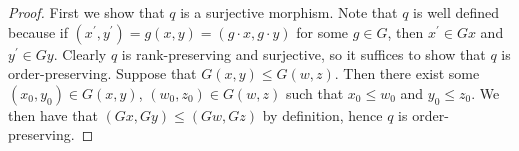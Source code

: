 \documentclass[10 pt]{amsart}
\theoremstyle{plain}
\theoremstyle{definition}
\theoremstyle{remark}
\numberwithin{equation}{section}
\theoremstyle{remark}
\begin{document}
\begin{proof}



First we show that $q$ is a surjective morphism.  Note that $q$ is well defined because if $(x^\prime, y^\prime) = g(x, y) = (g\cdot x, g\cdot y)$ for some $g\in G$, then $x^\prime\in Gx$ and $y^\prime\in Gy$.  Clearly $q$ is rank-preserving and surjective, so it suffices to show that $q$ is order-preserving.  Suppose that $G(x, y) \le G(w, z)$.  Then there exist some $(x_0, y_0)\in G(x, y)$, $(w_0, z_0)\in G(w, z)$ such that $x_0\le w_0$ and $y_0\le z_0$.  We then have that $(Gx, Gy) \le (Gw, Gz)$ by definition, hence $q$ is order-preserving.
\end{proof}
\end{document}
